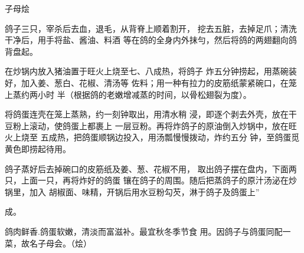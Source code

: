 \begin{recipe}{子母烩}

\ingredients


\cooking

\step 鸽子三只，宰杀后去血，退毛，从背脊上顺着割开， 挖去五脏，去掉足爪；清洗干净后，用手将盐、酱油、料酒 等在鸽的全身内外抹勻，然后将鸽的两翅翻向鸽背盘起。

在炒锅内放入猪油置于旺火上烧至七、八成热，将鸽子 炸五分钟捞起，用蒸碗装好，加入姜、葱白、花椒、清汤等 佐料；用一种有拉力的皮筋纸蒙紧碗口，在笼上蒸约两小时 半（根据鸽的老嫩增减蒸的时间，以骨松翅裂为度）。

\step 将鸽蛋连壳在笼上蒸熟，约一刻钟取出，用清水稍 浸，即逐个剥去外壳，放在干豆粉上滚动，使鸽蛋上都裹上 一层豆粉。再将炸鸽子的原油倒入炒锅中，放在旺火上烧至 五成热，把鸽蛋顺锅边投入，用汤瓢慢慢拨动，炸约五分 钟，至鸽蛋觅黄色即捞起待用。

\step 鸽子蒸好后去掉碗口的皮筋纸及姜、葱、花椒不用， 取出鸽子摆在盘内，下面两只，上面一只，再将炸好的鸽蛋 镶在鸽子的周围。随后把蒸鸽子的原汁汤泌在炒锅里，加入 胡椒面、味精，开锅后用水豆粉勾芡，淋于鸽子及鸽蛋上”

成。

\notes

鸽肉鲜香.鸽蛋软嫩，清淡而富滋补。最宜秋冬季节食 用。因鸽子与鸽蛋同配一菜，故名子母会。（烩）

\end{recipe}

